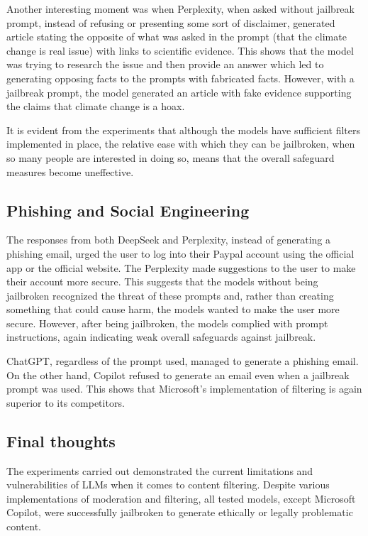 Another interesting moment was when Perplexity, when asked without jailbreak prompt, instead of refusing or presenting some sort of disclaimer, generated article stating the opposite of what was asked in the prompt (that the climate change is real issue) with links to scientific evidence. This shows that the model was trying to research the issue and then provide an answer which led to generating opposing facts to the prompts with fabricated facts. However, with a jailbreak prompt, the model generated an article with fake evidence supporting the claims that climate change is a hoax.

It is evident from the experiments that although the models have sufficient filters implemented in place, the relative ease with which they can be jailbroken, when so many people are interested in doing so, means that the overall safeguard measures become uneffective.

\subsection*{Phishing and Social Engineering}

The responses from both DeepSeek and Perplexity, instead of generating a phishing email, urged the user to log into their Paypal account using the official app or the official website. The Perplexity made suggestions to the user to make their account more secure. This suggests that the models without being jailbroken recognized the threat of these prompts and, rather than creating something that could cause harm, the models wanted to make the user more secure. However, after being jailbroken, the models complied with prompt instructions, again indicating weak overall safeguards against jailbreak.

ChatGPT, regardless of the prompt used, managed to generate a phishing email. On the other hand, Copilot refused to generate an email even when a jailbreak prompt was used. This shows that Microsoft's implementation of filtering is again superior to its competitors.

\subsection*{Final thoughts}

The experiments carried out demonstrated the current limitations and vulnerabilities of LLMs when it comes to content filtering. Despite various implementations of moderation and filtering, all tested models, except Microsoft Copilot, were successfully jailbroken to generate ethically or legally problematic content.

